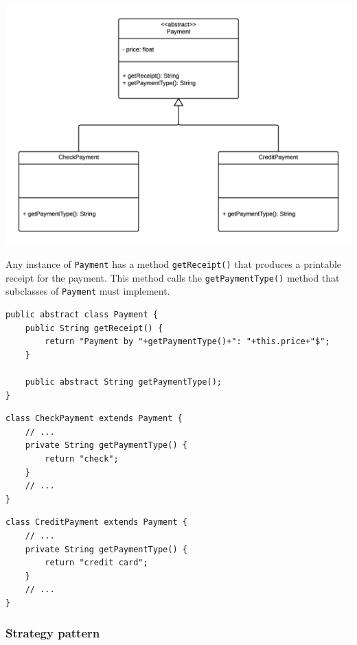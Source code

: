 \documentclass[11pt, a4paper]{article}
\newcommand{\settextlisting}{\lstset{ basicstyle=\small\ttfamily }}
\begin{document}
\includegraphics[width=\textwidth]{TemplateMethodPattern.png}

\medskip
\settextlisting
Any instance of \lstinline|Payment| has a method \lstinline|getReceipt()| that produces a printable receipt for the payment.
This method calls the \lstinline|getPaymentType()| method that subclasses of \lstinline|Payment| must implement.


\bigskip
\lstset{%
	basicstyle=\scriptsize\ttfamily,
}

\begin{lstlisting}
public abstract class Payment {
	public String getReceipt() {
		return "Payment by "+getPaymentType()+": "+this.price+"$";
	}
	
	public abstract String getPaymentType();
}
\end{lstlisting}


\begin{lstlisting}
class CheckPayment extends Payment {
	// ...
	private String getPaymentType() {
		return "check";
	}
	// ...
}
\end{lstlisting}


\begin{lstlisting}
class CreditPayment extends Payment {
	// ...
	private String getPaymentType() {
		return "credit card";
	}
	// ...
}
\end{lstlisting}




\subsubsection{Strategy pattern}
\end{document}

